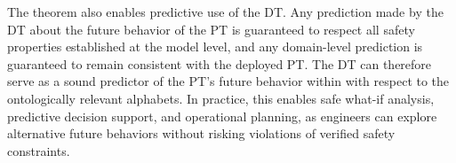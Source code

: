 

The theorem also enables predictive use of the DT. Any prediction made by the DT about the future behavior of the PT is guaranteed to respect all safety properties established at the model level, and any domain-level prediction is guaranteed to remain consistent with the deployed PT. The DT can therefore serve as a sound predictor of the PT's future behavior within with respect to the ontologically relevant alphabets. In practice, this enables safe what-if analysis, predictive decision support, and operational planning, as engineers can explore alternative future behaviors without risking violations of verified safety constraints.


